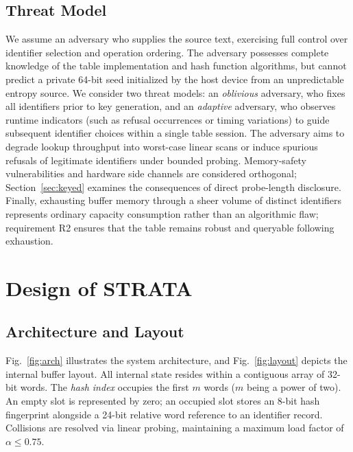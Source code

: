 \subsection{Threat Model}
\label{sec:threat}
We assume an adversary who supplies the source text, exercising full control over identifier selection and operation ordering. The adversary possesses complete knowledge of the table implementation and hash function algorithms, but cannot predict a private 64-bit seed initialized by the host device from an unpredictable entropy source. We consider two threat models: an \emph{oblivious} adversary, who fixes all identifiers prior to key generation, and an \emph{adaptive} adversary, who observes runtime indicators (such as refusal occurrences or timing variations) to guide subsequent identifier choices within a single table session. The adversary aims to degrade lookup throughput into worst-case linear scans or induce spurious refusals of legitimate identifiers under bounded probing. Memory-safety vulnerabilities and hardware side channels are considered orthogonal; Section~\ref{sec:keyed} examines the consequences of direct probe-length disclosure. Finally, exhausting buffer memory through a sheer volume of distinct identifiers represents ordinary capacity consumption rather than an algorithmic flaw; requirement R2 ensures that the table remains robust and queryable following exhaustion.

\section{Design of STRATA}
\label{sec:design}

\subsection{Architecture and Layout}

Fig.~\ref{fig:arch} illustrates the system architecture, and Fig.~\ref{fig:layout} depicts the internal buffer layout. All internal state resides within a contiguous array of 32-bit words. The \emph{hash index} occupies the first $m$ words ($m$ being a power of two). An empty slot is represented by zero; an occupied slot stores an 8-bit hash fingerprint alongside a 24-bit relative word reference to an identifier record. Collisions are resolved via linear probing, maintaining a maximum load factor of $\alpha \le 0.75$.

